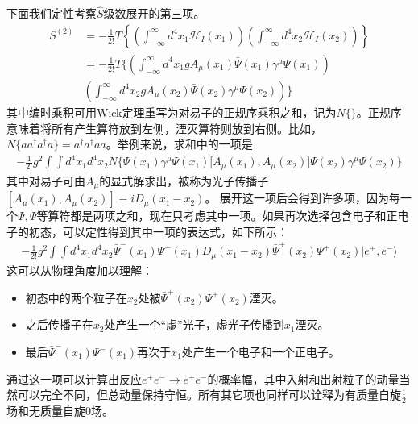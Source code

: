 下面我们定性考察$\hat{S}$级数展开的第三项。
\begin{align}
S^{(2)}&=-\frac{1}{2!}T\left\{ \left( \int_{-\infty}^\infty d^4x_1\mathscr{H}_I(x_1)\right)\left( \int_{-\infty}^\infty d^4x_2\mathscr{H}_I(x_2)\right)\right\} \nonumber \\
&=-\frac{1}{2!}T\bigg\{\left( \int_{-\infty}^\infty d^4x_1gA_\mu(x_1)\bar{\Psi}(x_1)\gamma^\mu\Psi(x_1)\right) \nonumber \\
&\left( \int_{-\infty}^\infty d^4x_2gA_\mu(x_2)\bar{\Psi}(x_2)\gamma^\mu\Psi(x_2)\right)\bigg\} \label{equ9.75}
\end{align}
其中编时乘积可用Wick定理重写为对易子的正规序乘积之和，记为$N\{\}$。正规序意味着将所有产生算符放到左侧，湮灭算符则放到右侧。比如，$N\{aa^\dag a^\dag a\}=a^\dag a^\dag aa$。举例来说，求和中的一项是
\begin{gather*}
-\frac{1}{2!}g^2\int\int d^4x_1 d^4x_2 N\Big\{ \bar{\Psi}(x_1)\gamma^\mu\Psi(x_1) \big[A_\mu(x_1),A_\mu(x_2)\big]\bar{\Psi}(x_2)\gamma^\mu\Psi(x_2)\Big\}
\end{gather*}
其中对易子可由$A_\mu$的显式解求出，被称为光子传播子$[A_\mu(x_1),A_\mu(x_2)]\equiv iD_\mu(x_1-x_2)$。
展开这一项后会得到许多项，因为每一个$\Psi,\bar{\Psi}$等算符都是两项之和，现在只考虑其中一项。如果再次选择包含电子和正电子的初态，可以定性得到其中一项的表达式，如下所示：
\begin{align}\label{equ9.76}
-\frac{1}{2!}g^2\int\int d^4x_1 d^4x_2 \bar{\Psi}^-(x_1)\Psi^-(x_1)D_\mu(x_1-x_2)\bar{\Psi}^+(x_2)\Psi^+(x_2)|e^+,e^-\rangle
\end{align}
这可以从物理角度加以理解：
\begin{itemize}
\item 初态中的两个粒子在$x_2$处被$\bar{\Psi}^+(x_2)\Psi^+(x_2)$湮灭。
\item 之后传播子在$x_2$处产生一个“虚”光子，虚光子传播到$x_1$湮灭。
\item 最后$\bar{\Psi}^-(x_1)\Psi^-(x_1)$再次于$x_1$处产生一个电子和一个正电子。
\end{itemize}
通过这一项可以计算出反应$e^+e^-\to e^+ e^-$的概率幅，其中入射和岀射粒子的动量当然可以完全不同，但总动量保持守恒。所有其它项也同样可以诠释为有质量自旋$\frac{1}{2}$场和无质量自旋$0$场。
{}

